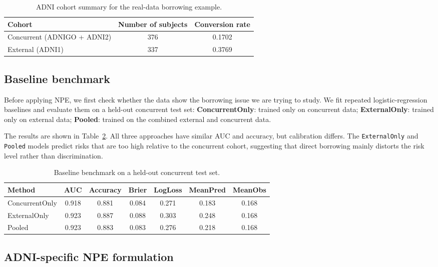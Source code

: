 \begin{table}[H]
\centering
\caption{ADNI cohort summary for the real-data borrowing example.}
\label{tab:adni-cohort-summary}
\begin{tabular}{lcc}
\toprule
Cohort & Number of subjects & Conversion rate \\
\midrule
Concurrent (ADNIGO + ADNI2) & 376 & 0.1702 \\
External (ADNI1)            & 337 & 0.3769 \\
\bottomrule
\end{tabular}
\end{table}

\subsection{Baseline benchmark}

Before applying NPE, we first check whether the data show the borrowing issue
we are trying to study. We fit repeated logistic-regression baselines and
evaluate them on a held-out concurrent test set:  \textbf{ConcurrentOnly}: trained only on concurrent data;
     \textbf{ExternalOnly}: trained only on external data;
     \textbf{Pooled}: trained on the combined external and concurrent data.

The results are shown in Table~\ref{tab:adni-baselines}. All three approaches
have similar AUC and accuracy, but calibration differs. The
\texttt{ExternalOnly} and \texttt{Pooled} models predict risks that are too high
relative to the concurrent cohort, suggesting that direct borrowing mainly
distorts the risk level rather than discrimination.

\begin{table}[H]
\centering
\caption{Baseline benchmark on a held-out concurrent test set.}
\label{tab:adni-baselines}
\begin{tabular}{lcccccc}
\toprule
Method & AUC & Accuracy & Brier & LogLoss & MeanPred & MeanObs \\
\midrule
ConcurrentOnly & 0.918 & 0.881 & 0.084 & 0.271 & 0.183 & 0.168 \\
ExternalOnly   & 0.923 & 0.887 & 0.088 & 0.303 & 0.248 & 0.168 \\
Pooled         & 0.923 & 0.883 & 0.083 & 0.276 & 0.218 & 0.168 \\
\bottomrule
\end{tabular}
\end{table}

\subsection{ADNI-specific NPE formulation}

